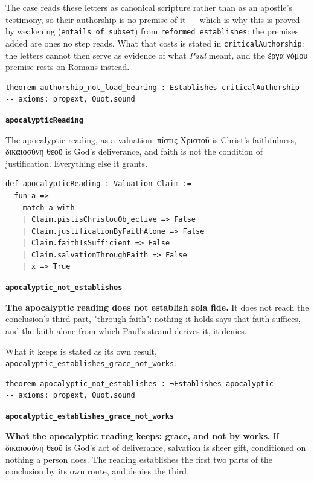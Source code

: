 \documentclass[11pt]{article}
\begin{document}
The case reads these letters as canonical scripture rather than as an apostle's testimony, so their authorship is no premise of it — which is why this is proved by weakening (\texttt{entails\_\allowbreak{}of\_\allowbreak{}subset}) from \texttt{reformed\_\allowbreak{}establishes}: the premises added are ones no step reads. What that costs is stated in \texttt{critical\allowbreak{}Authorship}: the letters cannot then serve as evidence of what \emph{Paul} meant, and the ἔργα νόμου premise rests on Romans instead.

{\small\begin{verbatim}
theorem authorship_not_load_bearing : Establishes criticalAuthorship
-- axioms: propext, Quot.sound
\end{verbatim}}
\par\medskip\noindent\textbf{\texttt{apocalyptic\allowbreak{}Reading}}\par\nobreak\noindent
The apocalyptic reading, as a valuation: πίστις Χριστοῦ is Christ's faithfulness, δικαιοσύνη θεοῦ is God's deliverance, and faith is not the condition of justification. Everything else it grants.

{\small\begin{verbatim}
def apocalypticReading : Valuation Claim :=
  fun a =>
    match a with
    | Claim.pistisChristouObjective => False
    | Claim.justificationByFaithAlone => False
    | Claim.faithIsSufficient => False
    | Claim.salvationThroughFaith => False
    | x => True
\end{verbatim}}
\par\medskip\noindent\textbf{\texttt{apocalyptic\_\allowbreak{}not\_\allowbreak{}establishes}}\par\nobreak\noindent
\textbf{The apocalyptic reading does not establish sola fide.} It does not reach the conclusion's third part, "through faith": nothing it holds says that faith suffices, and the faith alone from which Paul's strand derives it, it denies.

What it keeps is stated as its own result, \texttt{apocalyptic\_\allowbreak{}establishes\_\allowbreak{}grace\_\allowbreak{}not\_\allowbreak{}works}.

{\small\begin{verbatim}
theorem apocalyptic_not_establishes : ¬Establishes apocalyptic
-- axioms: propext, Quot.sound
\end{verbatim}}
\par\medskip\noindent\textbf{\texttt{apocalyptic\_\allowbreak{}establishes\_\allowbreak{}grace\_\allowbreak{}not\_\allowbreak{}works}}\par\nobreak\noindent
\textbf{What the apocalyptic reading keeps: grace, and not by works.} If δικαιοσύνη θεοῦ is God's act of deliverance, salvation is sheer gift, conditioned on nothing a person does. The reading establishes the first two parts of the conclusion by its own route, and denies the third.
\end{document}
